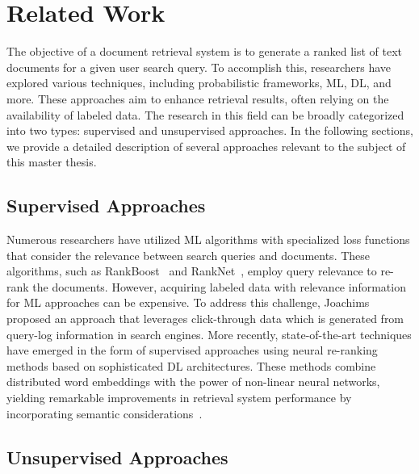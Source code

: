 
\chapter{Related Work}

The objective of a document retrieval system is to generate a ranked list of text documents for a given user search query. To accomplish this, researchers have explored various techniques, including probabilistic frameworks, \ac{ML}, \ac{DL}, and more. These approaches aim to enhance retrieval results, often relying on the availability of labeled data. The research in this field can be broadly categorized into two types: supervised and unsupervised approaches. In the following sections, we provide a detailed description of several approaches relevant to the subject of this master thesis.

\section{Supervised Approaches}


Numerous researchers have utilized \ac{ML} algorithms with specialized loss functions that consider the relevance between search queries and documents. These algorithms, such as RankBoost~\cite{freund2003efficient} and RankNet~\cite{burges2005learning}, employ query relevance to re-rank the documents. However, acquiring labeled data with relevance information for \ac{ML} approaches can be expensive. To address this challenge, Joachims~\cite{joachims2002optimizing} proposed an approach that leverages click-through data which is generated from query-log information in search engines. More recently, state-of-the-art techniques have emerged in the form of supervised approaches using neural re-ranking methods based on sophisticated \ac{DL} architectures. These methods combine distributed word embeddings with the power of non-linear neural networks, yielding remarkable improvements in retrieval system performance by incorporating semantic considerations~\cite{mitra2017learning, guo2016deep, nogueira2019passage}.

\section{Unsupervised Approaches}

